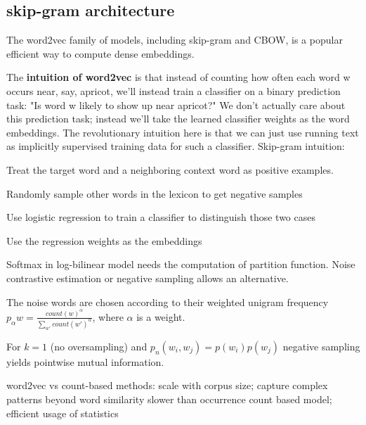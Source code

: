 \documentclass[12pt]{article}
\begin{document}
\subsection{skip-gram architecture}
\par The word2vec family of models, including skip-gram and CBOW, is a popular efficient way to compute dense embeddings.
\par The \textbf{intuition of word2vec} is that instead of counting how often each word w occurs near, say, apricot, we'll instead train a classifier on a binary prediction task: "Is word w likely to show up near apricot?" We don't actually care about this prediction task; instead we'll take the learned classifier weights as the word embeddings. The revolutionary intuition here is that we can just use running text as implicitly supervised training data for such a classifier.
Skip-gram intuition:
\ulb
\item Treat the target word and a neighboring context word as positive examples.
\item Randomly sample other words in the lexicon to get negative samples
\item Use logistic regression to train a classifier to distinguish those two cases
\item Use the regression weights as the embeddings
\ule
\par Softmax in log-bilinear model needs the computation of partition function. Noise contrastive estimation or negative sampling allows an alternative.
\par The noise words are chosen according to their weighted unigram frequency $p_{\alpha}w = \frac{count(w)^{\alpha}}{\sum_{w'}count(w')^{\alpha}}$, where $\alpha$ is a weight.
\par For $k=1$ (no oversampling) and $p_n(w_i, w_j)=p(w_i)p(w_j)$ negative sampling yields pointwise mutual information.
\par word2vec vs count-based methods:
\ulb
\pro scale with corpus size; capture complex patterns beyond word similarity
\con slower than occurrence count based model; efficient usage of statistics
\ule
\end{document}
